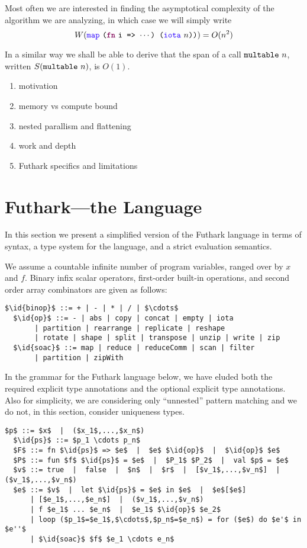 \documentclass[11pt]{book}
\begin{document}
\noindent
Most often we are interested in finding the asymptotical complexity of
the algorithm we are analyzing, in which case we will simply write
$$W(\fop{map}~\kw{(}\fw{fn}~\kw{i => $\cdots$) (}\fop{iota}~\kw{$n$))}) = O(n^2) $$

In a similar way we shall be able to derive that the span of a call $\texttt{multable}~n$, written $S(\texttt{multable}~n)$, is $O(1)$.

\begin{enumerate}
\item motivation
\item memory vs compute bound
\item nested parallism and flattening
\item work and depth
\item Futhark specifics and limitations
\end{enumerate}

\section{Futhark---the Language}

In this section we present a simplified version of the Futhark
language in terms of syntax, a type system for the language, and a
strict evaluation semantics.

We assume a countable infinite number of program variables, ranged over
by $x$ and $f$. Binary infix scalar operators, first-order built-in operations, and
second order array combinators are given as follows:

\begin{lstlisting}[mathescape=true]
  $\id{binop}$ ::= + | - | * | / | $\cdots$
  $\id{op}$ ::= - | abs | copy | concat | empty | iota
       | partition | rearrange | replicate | reshape
       | rotate | shape | split | transpose | unzip | write | zip
  $\id{soac}$ ::= map | reduce | reduceComm | scan | filter
       | partition | zipWith
\end{lstlisting}

In the grammar for the Futhark language below, we have eluded both the
required explicit type annotations and the optional explicit type
annotations. Also for simplicity, we are considering only ``unnested''
pattern matching and we do not, in this section, consider uniqueness types.

\begin{lstlisting}[mathescape=true]
  $p$ ::= $x$  |  ($x_1$,...,$x_n$)
  $\id{ps}$ ::= $p_1 \cdots p_n$
  $F$ ::= fn $\id{ps}$ => $e$  |  $e$ $\id{op}$  |  $\id{op}$ $e$
  $P$ ::= fun $f$ $\id{ps}$ = $e$  |  $P_1$ $P_2$  |  val $p$ = $e$
  $v$ ::= true  |  false  |  $n$  |  $r$  |  [$v_1$,...,$v_n$]  |  ($v_1$,...,$v_n$)
  $e$ ::= $v$  |  let $\id{ps}$ = $e$ in $e$  |  $e$[$e$]
      | [$e_1$,...,$e_n$]  |  ($v_1$,...,$v_n$)
      | f $e_1$ ... $e_n$  |  $e_1$ $\id{op}$ $e_2$
      | loop ($p_1$=$e_1$,$\cdots$,$p_n$=$e_n$) = for ($e$) do $e'$ in $e''$
      | $\id{soac}$ $f$ $e_1 \cdots e_n$
\end{lstlisting}
\end{document}
